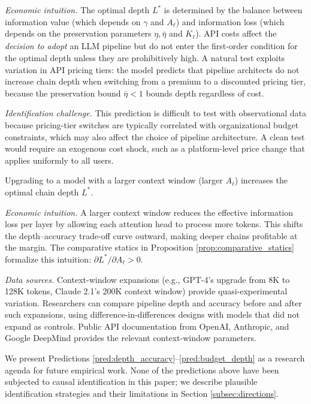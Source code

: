 \textit{Economic intuition.} The optimal depth $L^*$ is determined by the balance between information value (which depends on $\gamma$ and $A_\ell$) and information loss (which depends on the preservation parameters $\underline{\eta}, \bar{\eta}$ and $K_\ell$). API costs affect the \emph{decision to adopt} an LLM pipeline but do not enter the first-order condition for the optimal depth unless they are prohibitively high. A natural test exploits variation in API pricing tiers: the model predicts that pipeline architects do not increase chain depth when switching from a premium to a discounted pricing tier, because the preservation bound $\bar{\eta} < 1$ bounds depth regardless of cost.

\textit{Identification challenge.} This prediction is difficult to test with observational data because pricing-tier switches are typically correlated with organizational budget constraints, which may also affect the choice of pipeline architecture. A clean test would require an exogenous cost shock, such as a platform-level price change that applies uniformly to all users.

\begin{prediction}\label{pred:budget_depth}
Upgrading to a model with a larger context window (larger $A_\ell$) increases the optimal chain depth $L^*$.
\end{prediction}

\textit{Economic intuition.} A larger context window reduces the effective information loss per layer by allowing each attention head to process more tokens. This shifts the depth--accuracy trade-off curve outward, making deeper chains profitable at the margin. The comparative statics in Proposition \ref{prop:comparative_statics} formalize this intuition: $\partial L^*/\partial A_\ell > 0$.

\textit{Data sources.} Context-window expansions (e.g., GPT-4's upgrade from 8K to 128K tokens, Claude 2.1's 200K context window) provide quasi-experimental variation. Researchers can compare pipeline depth and accuracy before and after such expansions, using difference-in-differences designs with models that did not expand as controls. Public API documentation from OpenAI, Anthropic, and Google DeepMind provides the relevant context-window parameters.

We present Predictions \ref{pred:depth_accuracy}--\ref{pred:budget_depth} as a research agenda for future empirical work. None of the predictions above have been subjected to causal identification in this paper; we describe plausible identification strategies and their limitations in Section \ref{subsec:directions}.

